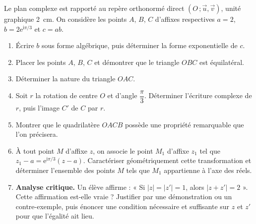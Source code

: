 \documentclass[11pt]{article}
\begin{document}
\begin{exercice}
Le plan complexe est rapporté au repère orthonormé direct $(O\,;\vec{u},\vec{v})$, unité graphique \SI{2}{cm}. On considère les points $A$, $B$, $C$ d'affixes respectives $a=2$, $b=2\mathrm{e}^{\mathrm{i}\pi/3}$ et $c=ab$.
\begin{enumerate}
\item Écrire $b$ sous forme algébrique, puis déterminer la forme exponentielle de $c$.
\item Placer les points $A$, $B$, $C$ et démontrer que le triangle $OBC$ est équilatéral.
\item Déterminer la nature du triangle $OAC$.
\item Soit $r$ la rotation de centre $O$ et d'angle $\dfrac{\pi}{3}$. Déterminer l'écriture complexe de $r$, puis l'image $C'$ de $C$ par $r$.
\item Montrer que le quadrilatère $OACB$ possède une propriété remarquable que l'on précisera.
\item À tout point $M$ d'affixe $z$, on associe le point $M_1$ d'affixe $z_1$ tel que $z_1-a=\mathrm{e}^{\mathrm{i}\pi/3}(z-a)$. Caractériser géométriquement cette transformation et déterminer l'ensemble des points $M$ tels que $M_1$ appartienne à l'axe des réels.
\item \textbf{Analyse critique.} Un élève affirme : « Si $|z|=|z'|=1$, alors $|z+z'|=2$ ». Cette affirmation est-elle vraie ? Justifier par une démonstration ou un contre-exemple, puis énoncer une condition nécessaire et suffisante sur $z$ et $z'$ pour que l'égalité ait lieu.
\end{enumerate}
\end{exercice}
\end{document}
